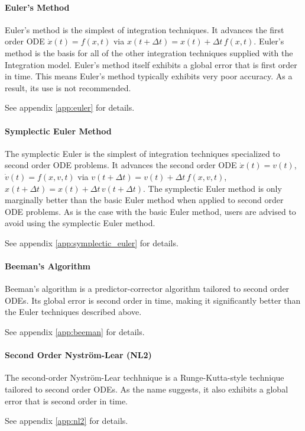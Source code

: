 \paragraph{Euler's Method}
Euler's method is the simplest of integration techniques.
It advances the first order ODE $\dot x(t) = f(x,t)$ via
$x(t+\Delta t) = x(t) + \Delta t \, f(x,t)$.
Euler's method is the basis for all of the other integration techniques supplied
with the \erseven Integration model. Euler's method itself exhibits a global
error that is first order in time. This means Euler's method typically exhibits
very poor accuracy. As a result, its use is not recommended.

See appendix \ref{app:euler} for details.

\paragraph{Symplectic Euler Method}
The symplectic Euler is the simplest of integration techniques
specialized to second order ODE problems.
It advances  the second order ODE
$\dot x(t) = v(t)$, $\dot v(t) = f(x,v,t)$ via
$v(t+\Delta t) = v(t) + \Delta t \, f(x,v,t)$,
$x(t+\Delta t) = x(t) + \Delta t \, v(t+\Delta t)$.
The symplectic Euler method is only marginally better than the basic Euler
method when applied to second order ODE problems.
As is the case with the basic Euler method,
users are advised to avoid using the symplectic Euler method.

See appendix \ref{app:symplectic_euler} for details.

\paragraph{Beeman's Algorithm}
Beeman's algorithm is a predictor-corrector algorithm tailored to
second order ODEs. Its global error is second order in time, making it
significantly better than the Euler techniques described above.

See appendix \ref{app:beeman} for details.

\paragraph{Second Order Nystr\"{o}m-Lear (NL2)}
The second-order Nystr\"{o}m-Lear techhnique is a Runge-Kutta-style technique
tailored to second order ODEs. As the name suggests, it also exhibits a
global error that is second order in time.

See appendix \ref{app:nl2} for details.

